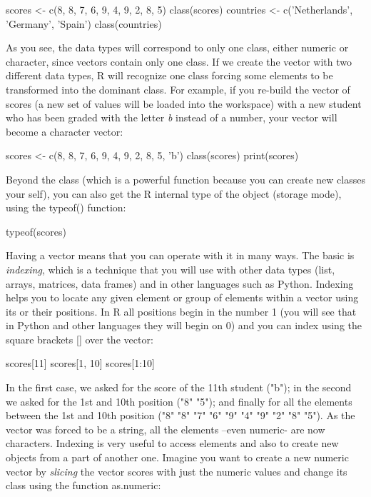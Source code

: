 \begin{exampler}
scores <- c(8, 8, 7, 6, 9, 4, 9, 2, 8, 5)
class(scores)
countries <- c('Netherlands', 'Germany', 'Spain')
class(countries)
\end{exampler}
 
As you see, the data types will correspond to only one class, either numeric or character, since vectors contain only one class. If we create the vector with two different data types, R will recognize one class forcing some elements to be transformed into the dominant class. For example, if you re-build the vector of scores (a new set of values will be loaded into the workspace) with a new student who has been graded with the letter \emph{b} instead of a number, your vector will become a character vector:

\begin{exampler}
scores <- c(8, 8, 7, 6, 9, 4, 9, 2, 8, 5,  'b')
class(scores)
print(scores)
\end{exampler}

Beyond the class (which is a powerful function because you can create new classes your self), you can also get the R internal type of the object (storage mode), using the typeof() function:

\begin{exampler}
typeof(scores)
\end{exampler}

Having a vector means that you can operate with it in many ways. The basic is \emph{indexing}, which is a technique that you will use with other data types (list, arrays, matrices, data frames) and in other languages such as Python.  Indexing helps you to locate any given element or group of elements within a vector using its or their positions. In R all positions begin in the number 1 (you will see that in Python and other languages they will begin on 0) and you can index using the square brackets [] over the vector:

\begin{exampler}
scores[11]
scores[1, 10]
scores[1:10]
\end{exampler}

In the first case, we asked for the score of the 11th student ("b"); in the second we asked for the 1st and 10th position ("8"  "5"); and finally for all the elements between the 1st and 10th position ("8" "8" "7" "6" "9" "4" "9" "2" "8" "5"). As the vector was forced to be a string, all the elements –even numeric- are now characters. Indexing is very useful to access elements and also to create new objects from a part of another one. Imagine you want to create a new numeric vector by \emph{slicing} the vector scores with just the numeric values and change its class using the function as.numeric:

